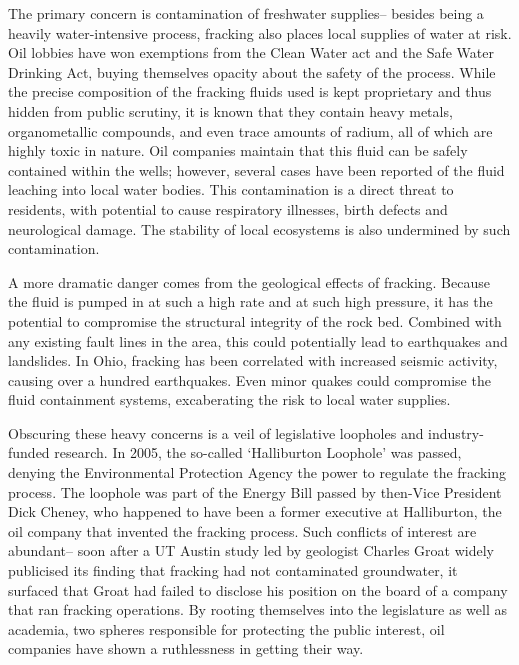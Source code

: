 \documentclass[12pt,letterpaper]{article}
\begin{document}
The primary concern is contamination of freshwater supplies-- besides being a heavily water-intensive process, fracking also places local supplies of water at risk. Oil lobbies have won exemptions from the Clean Water act and the Safe Water Drinking Act, buying themselves opacity about the safety of the process. While the precise composition of the fracking fluids used is kept proprietary and thus hidden from public scrutiny, it is known that they contain heavy metals, organometallic compounds, and even trace amounts of radium, all of which are highly toxic in nature. Oil companies maintain that this fluid can be safely contained within the wells; however, several cases have been reported of the fluid leaching into local water bodies. This contamination is a direct threat to residents, with potential to cause respiratory illnesses, birth defects and neurological damage. The stability of local ecosystems is also undermined by such contamination. 

A more dramatic danger comes from the geological effects of fracking. Because the fluid is pumped in at such a high rate and at such high pressure, it has the potential to compromise the structural integrity of the rock bed. Combined with any existing fault lines in the area, this could potentially lead to earthquakes and landslides. In Ohio, fracking has been correlated with increased seismic activity, causing over a hundred earthquakes. Even minor quakes could compromise the fluid containment systems, excaberating the risk to local water supplies.

Obscuring these heavy concerns is a veil of legislative loopholes and industry-funded research. In 2005, the so-called `Halliburton Loophole' was passed, denying the Environmental Protection Agency the power to regulate the fracking process. The loophole was part of the Energy Bill passed by then-Vice President Dick Cheney, who happened to have been a former executive at Halliburton, the oil company that invented the fracking process. Such conflicts of interest are abundant-- soon after a UT Austin study led by geologist Charles Groat widely publicised its finding that fracking had not contaminated groundwater, it surfaced that Groat had failed to disclose his position on the board of a company that ran fracking operations. By rooting themselves into the legislature as well as academia, two spheres responsible for protecting the public interest, oil companies have shown a ruthlessness in getting their way.

\makeworkscited
\end{document}
